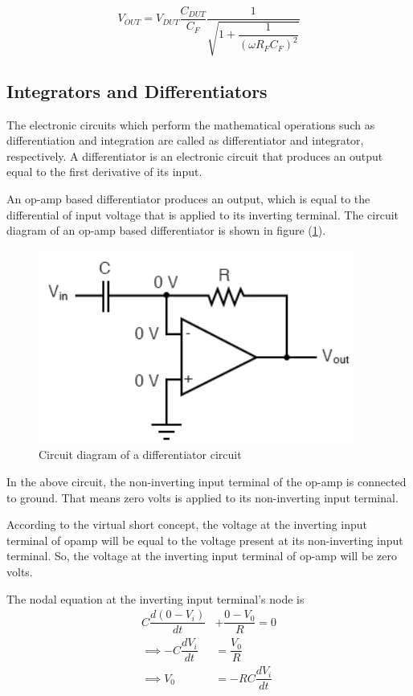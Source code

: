 \documentclass[%
 aip,
 amsmath,amssymb,
 reprint, floatfix%
]{revtex4-2}
\begin{document}
            \begin{equation}
                V_{OUT} = V_{DUT} \dfrac{C_{DUT}}{C_F} \dfrac{1}{\sqrt{1 + \dfrac{1}{(\omega R_F C_F)^2}}}
            \end{equation}
    \subsection{Integrators and Differentiators}
        The electronic circuits which perform the mathematical operations such as differentiation and integration are called as differentiator and integrator, respectively. A differentiator is an electronic circuit that produces an output equal to the first derivative of its input.
        \par
        An op-amp based differentiator produces an output, which is equal to the differential of input voltage that is applied to its inverting terminal. The circuit diagram of an op-amp based differentiator is shown in figure (\ref{fig:diff}).
        \begin{figure}
            \centering
            \includegraphics{Figures/differentiator.png}
            \caption{Circuit diagram of a differentiator circuit}
            \label{fig:diff}
        \end{figure}
        In the above circuit, the non-inverting input terminal of the op-amp is connected to ground. That means zero volts is applied to its non-inverting input terminal.
        \par
        According to the virtual short concept, the voltage at the inverting input terminal of opamp will be equal to the voltage present at its non-inverting input terminal. So, the voltage at the inverting input terminal of op-amp will be zero volts. 
        \par
        The nodal equation at the inverting input terminal's node is
        \begin{equation}
            \begin{split}
                C \dfrac{d (0-V_i)}{dt} &+ \dfrac{0-V_0}{R} = 0 \\
                \implies - C \dfrac{dV_i}{dt} &= \dfrac{V_0}{R} \\
                \implies V_0 &= -RC \dfrac{dV_i}{dt}
            \end{split}
        \end{equation}
\end{document}
